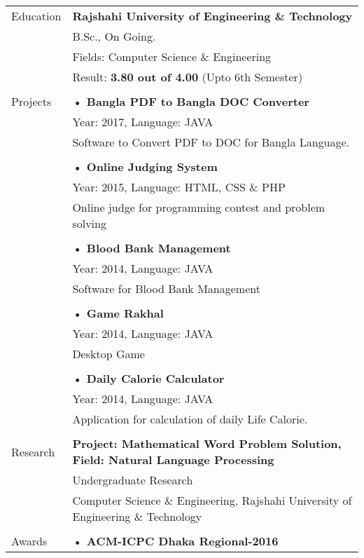 \documentclass[letterpaper,11pt,oneside]{article}
\begin{document}
\noindent \begin{tabular}{@{} l l}

 \Large{Education}    & \textbf{Rajshahi University of Engineering \& Technology} \\
     & B.Sc., On Going. \\
     & Fields: Computer Science \& Engineering \\
     & Result: \textbf{3.80 out of 4.00} (Upto 6th Semester)\\
     \\
 \Large{Projects}    & \textbf{• Bangla PDF to Bangla DOC Converter} \\
 	& Year: 2017, Language: JAVA\\
    & \parbox{5.0in}{Software to Convert PDF to DOC for Bangla Language.}\\
    & \\
    & \textbf{• Online Judging System}\\
    & Year: 2015, Language: HTML, CSS \& PHP \\
    & \parbox{5.0in}{Online judge for programming contest and problem solving}\\
    & \\
    & \textbf{• Blood Bank Management}\\
    & Year: 2014, Language: JAVA \\
    & \parbox{5.0in}{Software for Blood Bank Management}\\
    & \\
    & \textbf{• Game Rakhal}\\
    & Year: 2014, Language: JAVA \\
    & \parbox{5.0in}{Desktop Game}\\
    & \\
    & \textbf{• Daily Calorie Calculator}\\
    & Year: 2014, Language: JAVA \\
    & \parbox{5.0in}{Application for calculation of daily Life Calorie.}\\
    \\
 \Large{Research}    & \textbf{Project: Mathematical Word Problem Solution, Field: Natural Language Processing} \\
     & Undergraduate Research \\
     & Computer Science \& Engineering, Rajshahi University of Engineering \& Technology\\
     \\
  \Large{Awards}      & \textbf{• ACM-ICPC Dhaka Regional-2016} \\

\end{tabular}
\end{document}
